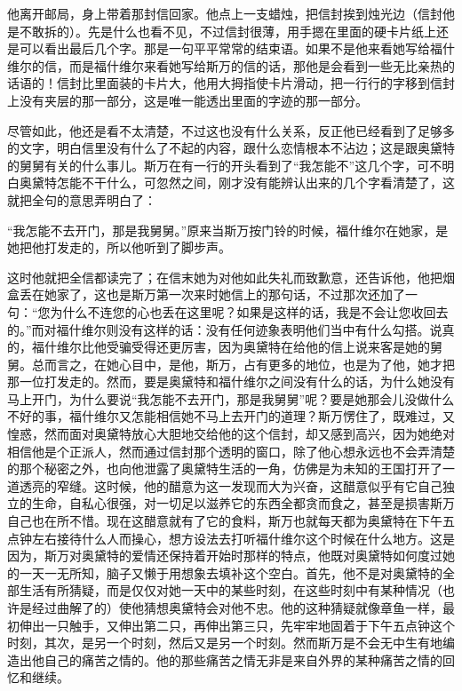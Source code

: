 \par 他离开邮局，身上带着那封信回家。他点上一支蜡烛，把信封挨到烛光边（信封他是不敢拆的）。先是什么也看不见，不过信封很薄，用手摁在里面的硬卡片纸上还是可以看出最后几个字。那是一句平平常常的结束语。如果不是他来看她写给福什维尔的信，而是福什维尔来看她写给斯万的信的话，那他是会看到一些无比亲热的话语的！信封比里面装的卡片大，他用大拇指使卡片滑动，把一行行的字移到信封上没有夹层的那一部分，这是唯一能透出里面的字迹的那一部分。
\par 尽管如此，他还是看不太清楚，不过这也没有什么关系，反正他已经看到了足够多的文字，明白信里没有什么了不起的内容，跟什么恋情根本不沾边；这是跟奥黛特的舅舅有关的什么事儿。斯万在有一行的开头看到了“我怎能不”这几个字，可不明白奥黛特怎能不干什么，可忽然之间，刚才没有能辨认出来的几个字看清楚了，这就把全句的意思弄明白了：
\par “我怎能不去开门，那是我舅舅。”原来当斯万按门铃的时候，福什维尔在她家，是她把他打发走的，所以他听到了脚步声。
\par 这时他就把全信都读完了；在信末她为对他如此失礼而致歉意，还告诉他，他把烟盒丢在她家了，这也是斯万第一次来时她信上的那句话，不过那次还加了一句：“您为什么不连您的心也丢在这里呢？如果是这样的话，我是不会让您收回去的。”而对福什维尔则没有这样的话：没有任何迹象表明他们当中有什么勾搭。说真的，福什维尔比他受骗受得还更厉害，因为奥黛特在给他的信上说来客是她的舅舅。总而言之，在她心目中，是他，斯万，占有更多的地位，也是为了他，她才把那一位打发走的。然而，要是奥黛特和福什维尔之间没有什么的话，为什么她没有马上开门，为什么要说“我怎能不去开门，那是我舅舅”呢？要是她那会儿没做什么不好的事，福什维尔又怎能相信她不马上去开门的道理？斯万愣住了，既难过，又惶惑，然而面对奥黛特放心大胆地交给他的这个信封，却又感到高兴，因为她绝对相信他是个正派人，然而通过信封那个透明的窗口，除了他心想永远也不会弄清楚的那个秘密之外，也向他泄露了奥黛特生活的一角，仿佛是为未知的王国打开了一道透亮的窄缝。这时候，他的醋意为这一发现而大为兴奋，这醋意似乎有它自己独立的生命，自私心很强，对一切足以滋养它的东西全都贪而食之，甚至是损害斯万自己也在所不惜。现在这醋意就有了它的食料，斯万也就每天都为奥黛特在下午五点钟左右接待什么人而操心，想方设法去打听福什维尔这个时候在什么地方。这是因为，斯万对奥黛特的爱情还保持着开始时那样的特点，他既对奥黛特如何度过她的一天一无所知，脑子又懒于用想象去填补这个空白。首先，他不是对奥黛特的全部生活有所猜疑，而是仅仅对她一天中的某些时刻，在这些时刻中有某种情况（也许是经过曲解了的）使他猜想奥黛特会对他不忠。他的这种猜疑就像章鱼一样，最初伸出一只触手，又伸出第二只，再伸出第三只，先牢牢地固着于下午五点钟这个时刻，其次，是另一个时刻，然后又是另一个时刻。然而斯万是不会无中生有地编造出他自己的痛苦之情的。他的那些痛苦之情无非是来自外界的某种痛苦之情的回忆和继续。
